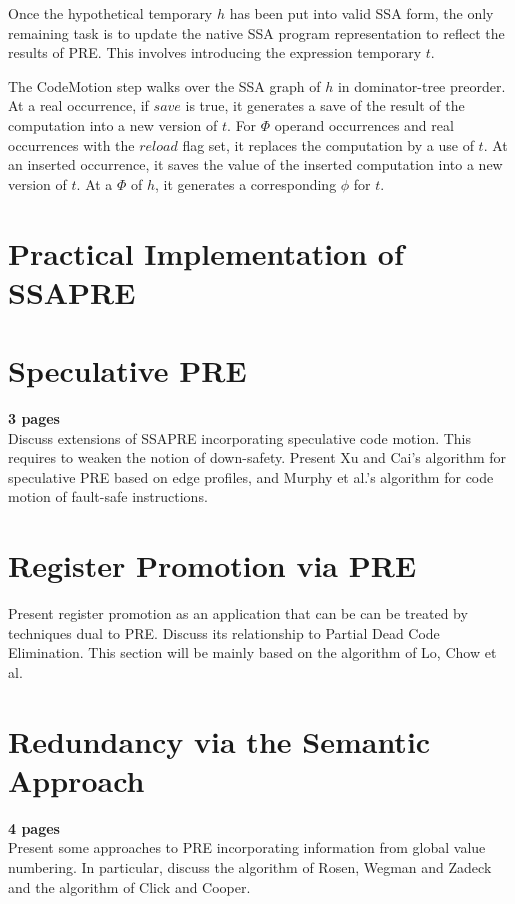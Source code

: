 Once the hypothetical temporary $h$ has been put into valid SSA form, the
only remaining task is to update the native SSA program representation to
reflect the results of PRE.  This involves introducing the expression
temporary $t$.

The CodeMotion step walks over the SSA graph of $h$ in dominator-tree 
preorder.  At a real occurrence, if $save$ is true, it generates a save
of the result of the computation into a new version of $t$.  For $\Phi$
operand occurrences and real occurrences with the $reload$ flag set, it
replaces the computation by a use of $t$.  At an inserted occurrence, it
saves the value of the inserted computation into a new version of $t$.
At a $\Phi$ of $h$, it generates a corresponding $\phi$ for $t$.

\section{Practical Implementation of SSAPRE}
 
\section{Speculative PRE}
{\bf 3 pages} \\
Discuss  extensions of SSAPRE incorporating speculative code 
motion. This requires to weaken the notion of down-safety. 
Present Xu and Cai's algorithm for speculative PRE based on 
edge profiles,  and  Murphy et al.'s algorithm for code motion 
of fault-safe instructions. 

\section{Register Promotion via PRE}
Present register promotion as an application that can be 
can be treated by techniques dual to PRE. Discuss its 
relationship to Partial Dead Code Elimination. This section 
will be mainly based on the algorithm of Lo, Chow et al. 

\section{Redundancy via the Semantic Approach}
\label{section:Part3:Pre_not_helped:SemanticPRE}
{\bf 4 pages} \\
Present some approaches to PRE incorporating information from global 
value numbering. In particular, discuss the  algorithm of Rosen, Wegman and 
 Zadeck and the algorithm of Click and Cooper. 


